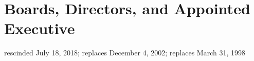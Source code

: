 \section{Boards, Directors, and Appointed Executive}
rescinded July 18, 2018; replaces December 4, 2002; replaces March 31, 1998

